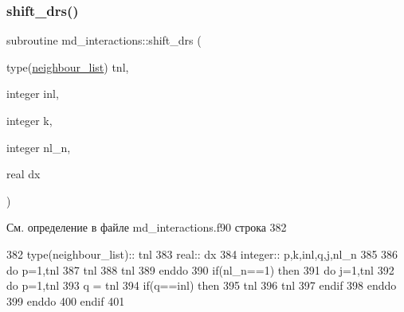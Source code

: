 \subsubsection{\texorpdfstring{shift\+\_\+drs()}{shift\_drs()}}
{\footnotesize\ttfamily subroutine md\+\_\+interactions\+::shift\+\_\+drs (\begin{DoxyParamCaption}\item[{type(\mbox{\hyperlink{structmd__general_1_1neighbour__list}{neighbour\+\_\+list}})}]{tnl,  }\item[{integer}]{inl,  }\item[{integer}]{k,  }\item[{integer}]{nl\+\_\+n,  }\item[{real}]{dx }\end{DoxyParamCaption})}



См. определение в файле md\+\_\+interactions.\+f90 строка 382


\begin{DoxyCode}
382     \textcolor{keywordtype}{type}(neighbour\_list):: tnl
383     \textcolor{keywordtype}{real}:: dx
384     \textcolor{keywordtype}{integer}:: p,k,inl,q,j,nl\_n
385     
386     \textcolor{keywordflow}{do} p=1,tnl%
387         tnl%
388         tnl%
389 \textcolor{keywordflow}{    enddo}
390     \textcolor{keywordflow}{if}(nl\_n==1) \textcolor{keywordflow}{then}
391         \textcolor{keywordflow}{do} j=1,tnl%
392             \textcolor{keywordflow}{do} p=1,tnl%
393                 q = tnl%
394                 \textcolor{keywordflow}{if}(q==inl) \textcolor{keywordflow}{then}
395                     tnl%
396                     tnl%
397 \textcolor{keywordflow}{                endif}
398 \textcolor{keywordflow}{            enddo}
399 \textcolor{keywordflow}{        enddo}
400 \textcolor{keywordflow}{    endif}
401 
\end{DoxyCode}
\mbox{\label{namespacemd__interactions_a2c4725fefbad36399f5de45a222b5d4e}} 
